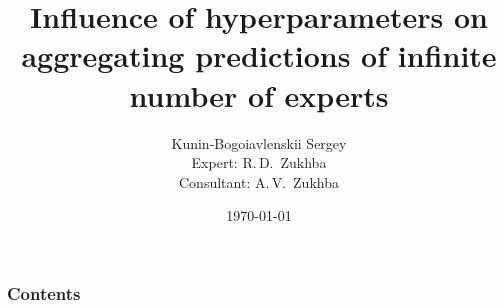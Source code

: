


\title[Experts aggregating]{Influence of hyperparameters on aggregating predictions of infinite number of experts} %

\author[Kunin-Bogoiavlenskii S.]{Kunin-Bogoiavlenskii Sergey \\ Expert: R.\,D.~Zukhba\\ Consultant: A.\,V.~Zukhba} %
\date{\today} %



\begin{frame}
\titlepage %
\end{frame}

\begin{frame}
\frametitle{Contents} %
\tableofcontents %
\end{frame}


